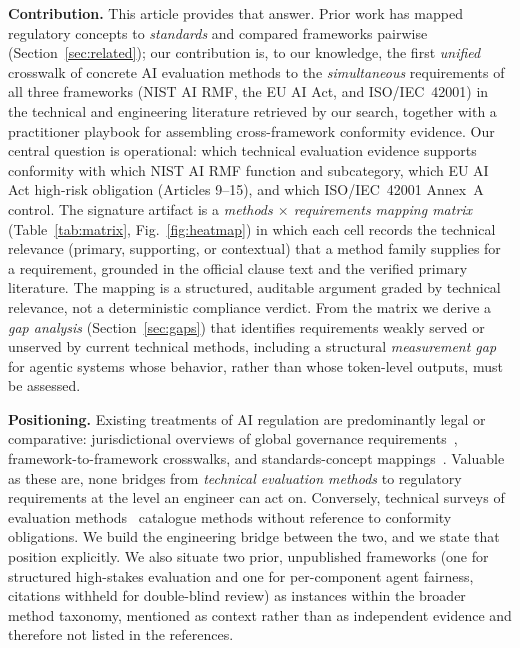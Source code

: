 \textbf{Contribution.} This article provides that answer. Prior work has mapped regulatory
concepts to \emph{standards} and compared frameworks pairwise (Section~\ref{sec:related});
our contribution is, to our knowledge, the first \emph{unified} crosswalk of concrete AI
evaluation methods to the \emph{simultaneous} requirements of all three frameworks (NIST
AI RMF, the EU AI Act, and ISO/IEC~42001) in the technical and engineering literature retrieved by our search, together with a
practitioner playbook for assembling cross-framework conformity evidence. Our central
question is operational: which technical evaluation evidence supports conformity with which
NIST AI RMF function and subcategory, which EU AI Act high-risk obligation (Articles
9--15), and which ISO/IEC~42001 Annex~A control. The signature artifact is a
\emph{methods $\times$ requirements mapping matrix} (Table~\ref{tab:matrix},
Fig.~\ref{fig:heatmap}) in which each cell records the technical relevance (primary,
supporting, or contextual) that a method family supplies for a requirement, grounded in the
official clause text and the verified primary literature. The mapping is a structured,
auditable argument graded by technical relevance, not a deterministic compliance verdict. From the matrix we derive a
\emph{gap analysis} (Section~\ref{sec:gaps}) that identifies requirements weakly served
or unserved by current technical methods, including a structural \emph{measurement gap}
for agentic systems whose behavior, rather than whose token-level outputs, must be
assessed.

\textbf{Positioning.} Existing treatments of AI regulation are predominantly legal or
comparative: jurisdictional overviews of global governance
requirements~\cite{global2024governance}, framework-to-framework crosswalks, and
standards-concept mappings~\cite{hernandez2024knowledgegraph}. Valuable as these are,
none bridges from \emph{technical evaluation methods} to regulatory requirements at the
level an engineer can act on. Conversely, technical surveys of evaluation
methods~\cite{chang2024survey,yehudai2025survey} catalogue methods without reference to
conformity obligations. We build the engineering bridge between the two, and we
state that position explicitly. We also situate two prior, unpublished
frameworks (one for structured high-stakes evaluation and one for per-component agent
fairness, citations withheld for double-blind review) as instances within the broader
method taxonomy, mentioned as context rather than as independent evidence and therefore
not listed in the references.

